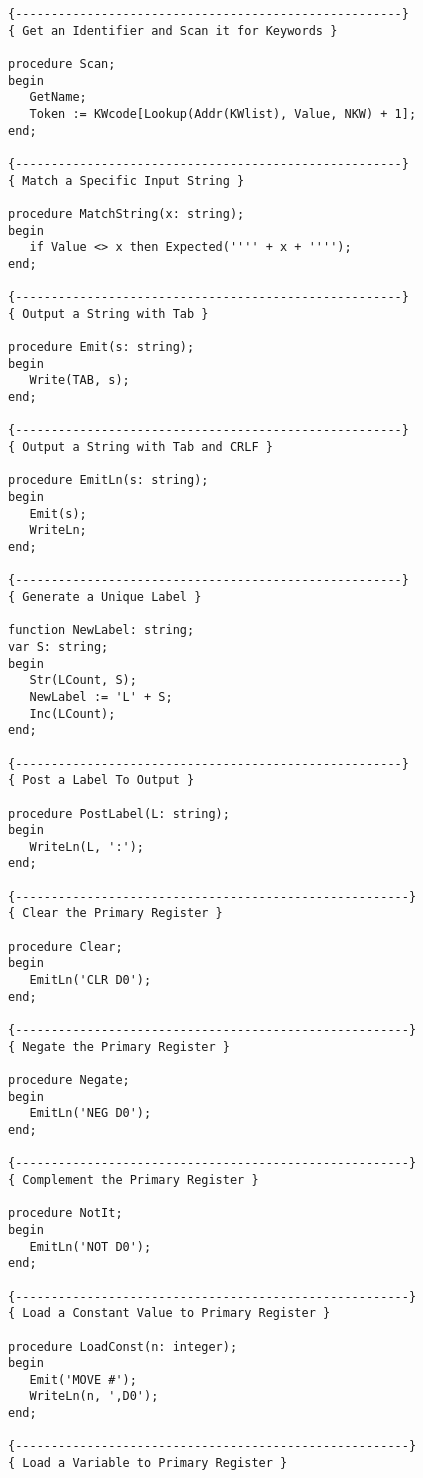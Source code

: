 \begin{verbatim}
{------------------------------------------------------}
{ Get an Identifier and Scan it for Keywords }

procedure Scan;
begin
   GetName;
   Token := KWcode[Lookup(Addr(KWlist), Value, NKW) + 1];
end;

{------------------------------------------------------}
{ Match a Specific Input String }

procedure MatchString(x: string);
begin
   if Value <> x then Expected('''' + x + '''');
end;

{------------------------------------------------------}
{ Output a String with Tab }

procedure Emit(s: string);
begin
   Write(TAB, s);
end;

{------------------------------------------------------}
{ Output a String with Tab and CRLF }

procedure EmitLn(s: string);
begin
   Emit(s);
   WriteLn;
end;

{------------------------------------------------------}
{ Generate a Unique Label }

function NewLabel: string;
var S: string;
begin
   Str(LCount, S);
   NewLabel := 'L' + S;
   Inc(LCount);
end;

{------------------------------------------------------}
{ Post a Label To Output }

procedure PostLabel(L: string);
begin
   WriteLn(L, ':');
end;

{-------------------------------------------------------}
{ Clear the Primary Register }

procedure Clear;
begin
   EmitLn('CLR D0');
end;

{-------------------------------------------------------}
{ Negate the Primary Register }

procedure Negate;
begin
   EmitLn('NEG D0');
end;

{-------------------------------------------------------}
{ Complement the Primary Register }

procedure NotIt;
begin
   EmitLn('NOT D0');
end;

{-------------------------------------------------------}
{ Load a Constant Value to Primary Register }

procedure LoadConst(n: integer);
begin
   Emit('MOVE #');
   WriteLn(n, ',D0');
end;

{-------------------------------------------------------}
{ Load a Variable to Primary Register }


\end{verbatim}
